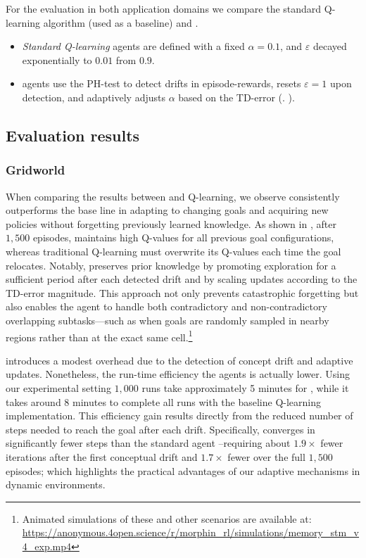 For the evaluation in both application domains we compare the standard Q-learning algorithm (used as a baseline) and \adaptiverl.
\begin{itemize}
  \item \emph{Standard Q-learning} agents are defined with a fixed $\alpha=0.1$, and $\varepsilon$ decayed exponentially to $0.01$ from $0.9$.
  \item \adaptiverl agents use the PH-test to detect drifts in episode-rewards, resets $\varepsilon\!=\!1$ upon detection, and adaptively adjusts $\alpha$ based on the TD-error (\cf. ).  
\end{itemize}

\subsection{Evaluation results}

\subsubsection{Gridworld}

When comparing the results between \adaptiverl and Q-learning, we observe \adaptiverl consistently 
outperforms the base line in adapting to changing goals and acquiring new policies without forgetting 
previously learned knowledge. As shown in , after $1,500$ episodes, \adaptiverl 
maintains high Q-values for all previous goal configurations, whereas traditional Q-learning must 
overwrite its Q-values each time the goal relocates. Notably, \adaptiverl preserves prior knowledge by 
promoting exploration for a sufficient period after each detected drift and by scaling updates according 
to the TD-error magnitude. This approach not only prevents catastrophic forgetting but also enables 
the agent to handle both contradictory and non-contradictory overlapping subtasks---such as when 
goals are randomly sampled in nearby regions rather than at the exact same cell.\footnote{Animated simulations of these and other scenarios are available at: \url{https://anonymous.4open.science/r/morphin_rl/simulations/memory_stm_v4_exp.mp4}}

\adaptiverl introduces a modest overhead due to the detection of concept drift and adaptive updates. 
Nonetheless, the run-time efficiency the agents is actually lower. Using our experimental setting 
$1,000$ runs take approximately 5 minutes for \adaptiverl, while it takes around 8 minutes to 
complete all runs with the baseline Q-learning implementation. This efficiency gain results directly 
from the reduced number of steps needed to reach the goal after each drift. Specifically, \adaptiverl 
converges in significantly fewer steps than the standard agent --requiring about $1.9\times$ fewer 
iterations after the first conceptual drift and $1.7\times$ fewer over the full $1,500$ episodes; which 
highlights the practical advantages of our adaptive mechanisms in dynamic environments.

